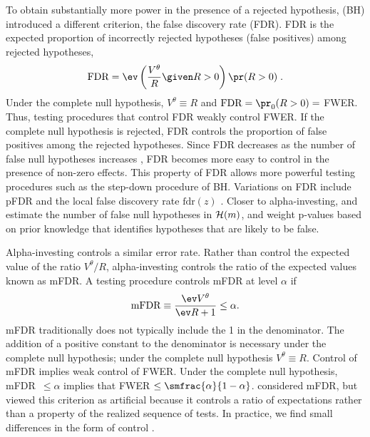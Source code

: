 \documentclass[12pt]{article}
\begin{document}
 To obtain substantially more power in the presence of a rejected hypothesis,
 \citet{benjamini95} (BH) introduced a different criterion, the false discovery
 rate (FDR).  FDR is the expected proportion of incorrectly rejected hypotheses
 (false positives) among rejected hypotheses,
\begin{equation}
  \mbox{FDR} = \ev \left(\frac{V^\theta}{R} \given R>0 \right) \pr(R>0) \;.
\label{eq:fdr}
\end{equation}
 Under the complete null hypothesis, $V^\theta \equiv R$ and $\mbox{FDR} =
 \pr_0(R>0) = $ FWER.  Thus, testing procedures that control FDR weakly control
 FWER.  If the complete null hypothesis is rejected, FDR controls the proportion
 of false positives among the rejected hypotheses.  Since FDR decreases as the
 number of false null hypotheses increases \citep{shaffer03}, FDR becomes more
 easy to control in the presence of non-zero effects.  This property of FDR
 allows more powerful testing procedures such as the step-down procedure of BH.
  Variations on FDR include pFDR \citep[which drops $\pr (R>0)$ from
 ; see][]{storey02,storey03} and the local false discovery rate
 $\mbox{fdr}(z)$ \citep[which estimates the false discovery rate; see
 ][]{efron07, efron10}.  Closer to alpha-investing, \citet{meinshausen04b} and
 \citet{rice06} estimate the number of false null hypotheses in ${\cal H}(m)$,
 and \citet{wasserman06} weight p-values based on prior knowledge that
 identifies hypotheses that are likely to be false.


 Alpha-investing controls a similar error rate.  Rather than control the
 expected value of the ratio $V^\theta/R$, alpha-investing controls the ratio of
 the expected values known as mFDR.  A testing procedure controls mFDR at level
 $\alpha$ if
\begin{equation}
\label{eq:mFDR}
\hbox{mFDR} \equiv \frac{\ev V^\theta}{\ev R + 1} \le \alpha.
\end{equation}
 mFDR traditionally does not typically include the 1 in the denominator.  The
 addition of a positive constant to the denominator is necessary under the
 complete null hypothesis; under the complete null hypothesis $V^\theta \equiv
 R$.  Control of mFDR implies weak control of FWER.  Under the complete null
 hypothesis, mFDR\ $\le \alpha$ implies that FWER $\le \smfrac{\alpha}{1 -
 \alpha}$.  \citet{benjamini95} considered mFDR, but viewed this criterion as
 artificial because it controls a ratio of expectations rather than a property
 of the realized sequence of tests.  In practice, we find small differences in
 the form of control \citep{fosterstine08}.
\end{document}
